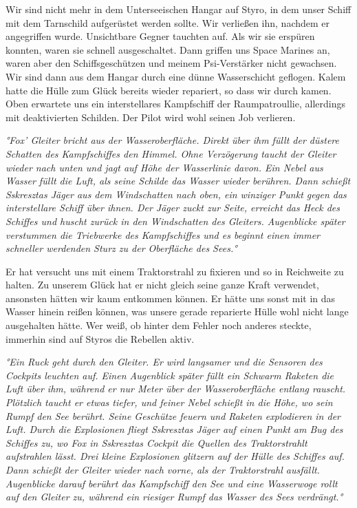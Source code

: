 \documentclass[11pt]{scrartcl}
\begin{document}
Wir sind nicht mehr in dem Unterseeischen Hangar auf Styro, in dem unser
Schiff mit dem Tarnschild aufgerüstet werden sollte. Wir verließen ihn,
nachdem er angegriffen wurde. Unsichtbare Gegner tauchten auf. Als wir
sie erspüren konnten, waren sie schnell ausgeschaltet. Dann griffen uns
Space Marines an, waren aber den Schiffsgeschützen und meinem
Psi-Verstärker nicht gewachsen. Wir sind dann aus dem Hangar durch eine
dünne Wasserschicht geflogen. Kalem hatte die Hülle zum Glück bereits
wieder repariert, so dass wir durch kamen. Oben erwartete uns ein
interstellares Kampfschiff der Raumpatroullie, allerdings mit
deaktivierten Schilden. Der Pilot wird wohl seinen Job verlieren.

\emph{°Fox' Gleiter bricht aus der Wasseroberfläche. Direkt über ihm
füllt der düstere Schatten des Kampfschiffes den Himmel. Ohne
Verzögerung taucht der Gleiter wieder nach unten und jagt auf Höhe der
Wasserlinie davon. Ein Nebel aus Wasser füllt die Luft, als seine
Schilde das Wasser wieder berühren. Dann schießt Sskresztas Jäger aus
dem Windschatten nach oben, ein winziger Punkt gegen das interstellare
Schiff über ihnen. Der Jäger zuckt zur Seite, erreicht das Heck des
Schiffes und huscht zurück in den Windschatten des Gleiters. Augenblicke
später verstummen die Triebwerke des Kampfschiffes und es beginnt einen
immer schneller werdenden Sturz zu der Oberfläche des Sees.°}

Er hat versucht uns mit einem Traktorstrahl zu fixieren und so in
Reichweite zu halten. Zu unserem Glück hat er nicht gleich seine ganze
Kraft verwendet, ansonsten hätten wir kaum entkommen können. Er hätte
uns sonst mit in das Wasser hinein reißen können, was unsere gerade
reparierte Hülle wohl nicht lange ausgehalten hätte. Wer weiß, ob hinter
dem Fehler noch anderes steckte, immerhin sind auf Styros die Rebellen
aktiv.

\emph{°Ein Ruck geht durch den Gleiter. Er wird langsamer und die
Sensoren des Cockpits leuchten auf. Einen Augenblick später füllt ein
Schwarm Raketen die Luft über ihm, während er nur Meter über der
Wasseroberfläche entlang rauscht. Plötzlich taucht er etwas tiefer, und
feiner Nebel schießt in die Höhe, wo sein Rumpf den See berührt. Seine
Geschütze feuern und Raketen explodieren in der Luft. Durch die
Explosionen fliegt Sskresztas Jäger auf einen Punkt am Bug des Schiffes
zu, wo Fox in Sskresztas Cockpit die Quellen des Traktorstrahlt
aufstrahlen lässt. Drei kleine Explosionen glitzern auf der Hülle des
Schiffes auf. Dann schießt der Gleiter wieder nach vorne, als der
Traktorstrahl ausfällt. Augenblicke darauf berührt das Kampfschiff den
See und eine Wasserwoge rollt auf den Gleiter zu, während ein riesiger
Rumpf das Wasser des Sees verdrängt.°}
\end{document}
